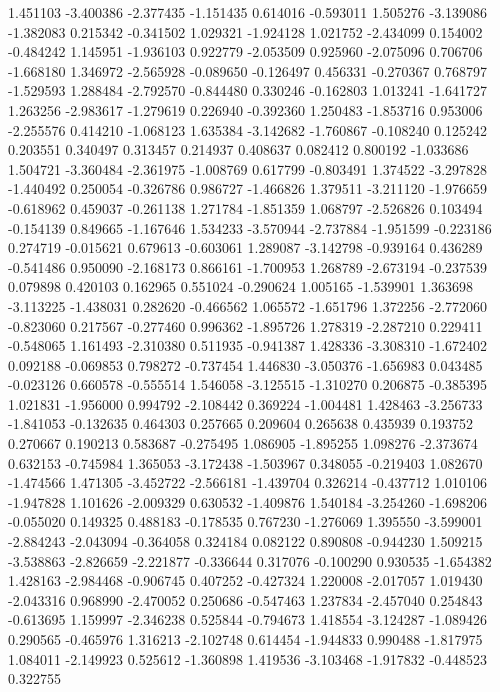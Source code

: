 1.451103
-3.400386
-2.377435
-1.151435
0.614016
-0.593011
1.505276
-3.139086
-1.382083
0.215342
-0.341502
1.029321
-1.924128
1.021752
-2.434099
0.154002
-0.484242
1.145951
-1.936103
0.922779
-2.053509
0.925960
-2.075096
0.706706
-1.668180
1.346972
-2.565928
-0.089650
-0.126497
0.456331
-0.270367
0.768797
-1.529593
1.288484
-2.792570
-0.844480
0.330246
-0.162803
1.013241
-1.641727
1.263256
-2.983617
-1.279619
0.226940
-0.392360
1.250483
-1.853716
0.953006
-2.255576
0.414210
-1.068123
1.635384
-3.142682
-1.760867
-0.108240
0.125242
0.203551
0.340497
0.313457
0.214937
0.408637
0.082412
0.800192
-1.033686
1.504721
-3.360484
-2.361975
-1.008769
0.617799
-0.803491
1.374522
-3.297828
-1.440492
0.250054
-0.326786
0.986727
-1.466826
1.379511
-3.211120
-1.976659
-0.618962
0.459037
-0.261138
1.271784
-1.851359
1.068797
-2.526826
0.103494
-0.154139
0.849665
-1.167646
1.534233
-3.570944
-2.737884
-1.951599
-0.223186
0.274719
-0.015621
0.679613
-0.603061
1.289087
-3.142798
-0.939164
0.436289
-0.541486
0.950090
-2.168173
0.866161
-1.700953
1.268789
-2.673194
-0.237539
0.079898
0.420103
0.162965
0.551024
-0.290624
1.005165
-1.539901
1.363698
-3.113225
-1.438031
0.282620
-0.466562
1.065572
-1.651796
1.372256
-2.772060
-0.823060
0.217567
-0.277460
0.996362
-1.895726
1.278319
-2.287210
0.229411
-0.548065
1.161493
-2.310380
0.511935
-0.941387
1.428336
-3.308310
-1.672402
0.092188
-0.069853
0.798272
-0.737454
1.446830
-3.050376
-1.656983
0.043485
-0.023126
0.660578
-0.555514
1.546058
-3.125515
-1.310270
0.206875
-0.385395
1.021831
-1.956000
0.994792
-2.108442
0.369224
-1.004481
1.428463
-3.256733
-1.841053
-0.132635
0.464303
0.257665
0.209604
0.265638
0.435939
0.193752
0.270667
0.190213
0.583687
-0.275495
1.086905
-1.895255
1.098276
-2.373674
0.632153
-0.745984
1.365053
-3.172438
-1.503967
0.348055
-0.219403
1.082670
-1.474566
1.471305
-3.452722
-2.566181
-1.439704
0.326214
-0.437712
1.010106
-1.947828
1.101626
-2.009329
0.630532
-1.409876
1.540184
-3.254260
-1.698206
-0.055020
0.149325
0.488183
-0.178535
0.767230
-1.276069
1.395550
-3.599001
-2.884243
-2.043094
-0.364058
0.324184
0.082122
0.890808
-0.944230
1.509215
-3.538863
-2.826659
-2.221877
-0.336644
0.317076
-0.100290
0.930535
-1.654382
1.428163
-2.984468
-0.906745
0.407252
-0.427324
1.220008
-2.017057
1.019430
-2.043316
0.968990
-2.470052
0.250686
-0.547463
1.237834
-2.457040
0.254843
-0.613695
1.159997
-2.346238
0.525844
-0.794673
1.418554
-3.124287
-1.089426
0.290565
-0.465976
1.316213
-2.102748
0.614454
-1.944833
0.990488
-1.817975
1.084011
-2.149923
0.525612
-1.360898
1.419536
-3.103468
-1.917832
-0.448523
0.322755
